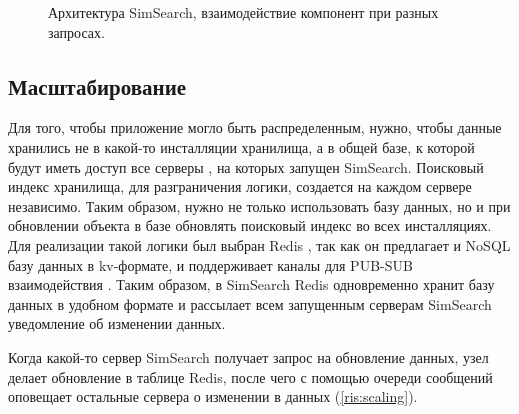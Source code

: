 \documentclass[a4paper,12pt]{extarticle}
\begin{document}
\begin{center}
\begin{figure}[H]
\caption{Архитектура SimSearch, взаимодействие компонент при разных запросах.}
\label{ris:architecture}
\end{figure}
\end{center}



\subsection{Масштабирование}

Для того, чтобы приложение могло быть распределенным, нужно, чтобы данные хранились не в какой-то инсталляции хранилища, а в общей базе, к которой будут иметь доступ все серверы \cite{enwiki:1086236982}, на которых запущен SimSearch. Поисковый индекс хранилища, для разграничения логики, создается на каждом сервере \cite{enwiki:1086236982} независимо. Таким образом, нужно не только использовать базу данных, но и при обновлении объекта в базе обновлять поисковый индекс во всех инсталляциях. Для реализации такой логики был выбран Redis \cite{redis}, так как он предлагает и NoSQL базу данных в kv-формате, и поддерживает каналы для PUB-SUB взаимодействия \cite{pubsub}. Таким образом, в SimSearch Redis одновременно хранит базу данных в удобном формате и рассылает всем запущенным серверам \cite{enwiki:1086236982} SimSearch уведомление об изменении данных.

Когда какой-то сервер SimSearch получает запрос на обновление данных, узел делает обновление в таблице Redis, после чего с помощью очереди сообщений оповещает остальные сервера о изменении в данных (\cref{ris:scaling}).
\end{document}

